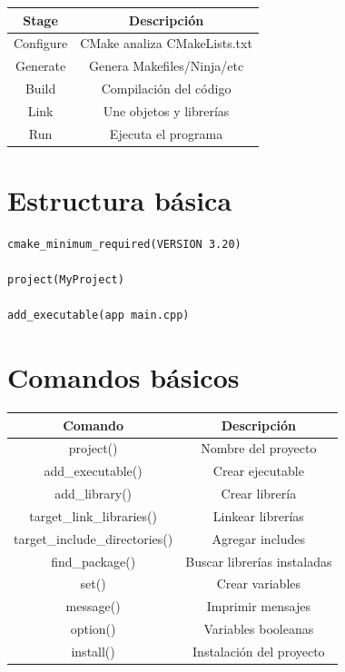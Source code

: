 \documentclass[a4paper,11pt]{article}
\begin{document}
\begin{center}
\begin{tabular}{| c | c |}
\hline
Stage & Descripción \\
\hline\hline
Configure & CMake analiza CMakeLists.txt \\
\hline
Generate & Genera Makefiles/Ninja/etc \\
\hline
Build & Compilación del código \\
\hline
Link & Une objetos y librerías \\
\hline
Run & Ejecuta el programa \\
\hline
\end{tabular}
\end{center}


\section*{Estructura básica}

\begin{lstlisting}
cmake_minimum_required(VERSION 3.20)

project(MyProject)

add_executable(app main.cpp)
\end{lstlisting}


\section*{Comandos básicos}

\begin{center}
\begin{tabular}{| c | c |}
\hline
Comando & Descripción \\
\hline\hline
project() & Nombre del proyecto \\
\hline
add\_executable() & Crear ejecutable \\
\hline
add\_library() & Crear librería \\
\hline
target\_link\_libraries() & Linkear librerías \\
\hline
target\_include\_directories() & Agregar includes \\
\hline
find\_package() & Buscar librerías instaladas \\
\hline
set() & Crear variables \\
\hline
message() & Imprimir mensajes \\
\hline
option() & Variables booleanas \\
\hline
install() & Instalación del proyecto \\
\hline
\end{tabular}
\end{center}
\end{document}
